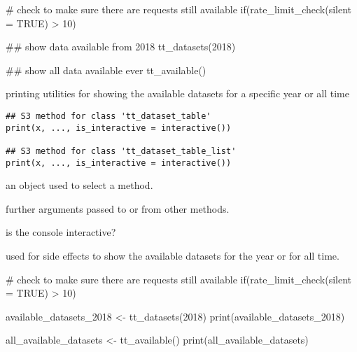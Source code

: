 \documentclass[letterpaper]{book}
\begin{document}
%
\begin{Examples}
\begin{ExampleCode}
# check to make sure there are requests still available
if(rate_limit_check(silent = TRUE) > 10){
 ## show data available from 2018
 tt_datasets(2018)

 ## show all data available ever
 tt_available()
}

\end{ExampleCode}
\end{Examples}
%
\begin{Description}\relax
printing utilities for showing the available datasets for a specific year or
all time
\end{Description}
%
\begin{Usage}
\begin{verbatim}
## S3 method for class 'tt_dataset_table'
print(x, ..., is_interactive = interactive())

## S3 method for class 'tt_dataset_table_list'
print(x, ..., is_interactive = interactive())
\end{verbatim}
\end{Usage}
%
\begin{Arguments}
\begin{ldescription}
\item[\code{x}] an object used to select a method.

\item[\code{...}] further arguments passed to or from other methods.

\item[\code{is\_interactive}] is the console interactive?
\end{ldescription}
\end{Arguments}
%
\begin{Value}
used for side effects to show the available datasets for the year or for all time.
\end{Value}
%
\begin{Examples}
\begin{ExampleCode}
# check to make sure there are requests still available
if(rate_limit_check(silent = TRUE) > 10){

 available_datasets_2018 <- tt_datasets(2018)
 print(available_datasets_2018)

 all_available_datasets <- tt_available()
 print(all_available_datasets)

}
\end{ExampleCode}
\end{Examples}
\end{document}
